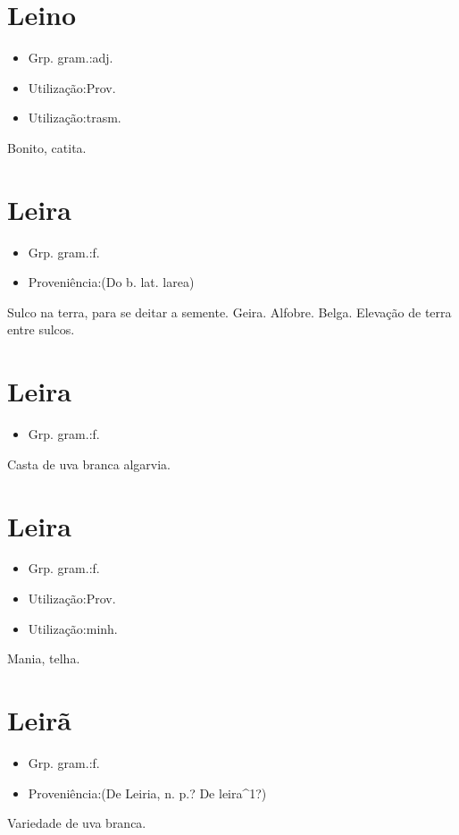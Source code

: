 \section{Leino}
\begin{itemize}
\item {Grp. gram.:adj.}
\end{itemize}
\begin{itemize}
\item {Utilização:Prov.}
\end{itemize}
\begin{itemize}
\item {Utilização:trasm.}
\end{itemize}
Bonito, catita.
\section{Leira}
\begin{itemize}
\item {Grp. gram.:f.}
\end{itemize}
\begin{itemize}
\item {Proveniência:(Do b. lat. \textunderscore larea\textunderscore )}
\end{itemize}
Sulco na terra, para se deitar a semente.
Geira.
Alfobre.
Belga.
Elevação de terra entre sulcos.
\section{Leira}
\begin{itemize}
\item {Grp. gram.:f.}
\end{itemize}
Casta de uva branca algarvia.
\section{Leira}
\begin{itemize}
\item {Grp. gram.:f.}
\end{itemize}
\begin{itemize}
\item {Utilização:Prov.}
\end{itemize}
\begin{itemize}
\item {Utilização:minh.}
\end{itemize}
Mania, telha.
\section{Leirã}
\begin{itemize}
\item {Grp. gram.:f.}
\end{itemize}
\begin{itemize}
\item {Proveniência:(De \textunderscore Leiria\textunderscore , n. p.? De \textunderscore leira\textunderscore ^1?)}
\end{itemize}
Variedade de uva branca.
